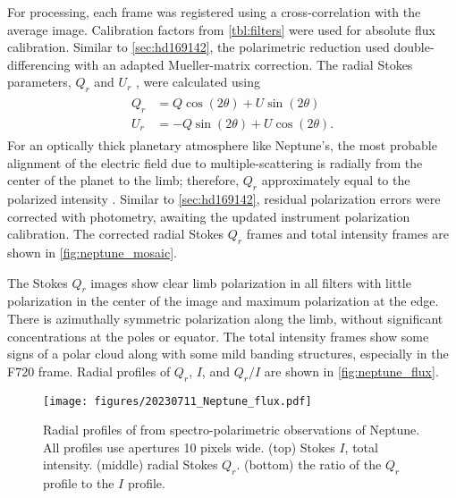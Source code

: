 For processing, each frame was registered using a cross-correlation with the average image. Calibration factors from \autoref{tbl:filters} were used for absolute flux calibration. Similar to \autoref{sec:hd169142}, the polarimetric reduction used double-differencing with an adapted Mueller-matrix correction. The radial Stokes parameters, $Q_r$ and $U_r$ \citep{schmid_limb_2006}, were calculated using
\begin{align}
    \label{eqn:rad_stokes}
\begin{split}
    Q_r &= Q\cos{\left(2\theta\right)} + U\sin{\left(2\theta\right)} \\
    U_r &= -Q\sin{\left(2\theta\right)} + U\cos{\left(2\theta\right)}.
\end{split}
\end{align}
For an optically thick planetary atmosphere like Neptune's, the most probable alignment of the electric field due to multiple-scattering is radially from the center of the planet to the limb; therefore, $Q_r$ approximately equal to the polarized intensity \citep{schmid_limb_2006}. Similar to \autoref{sec:hd169142}, residual polarization errors were corrected with photometry, awaiting the updated instrument polarization calibration. The corrected radial Stokes $Q_r$ frames and total intensity frames are shown in \autoref{fig:neptune_mosaic}.

The Stokes $Q_r$ images show clear limb polarization in all filters with little polarization in the center of the image and maximum polarization at the edge. There is azimuthally symmetric polarization along the limb, without significant concentrations at the poles or equator. The total intensity frames show some signs of a polar cloud along with some mild banding structures, especially in the F720 frame. Radial profiles of $Q_r$, $I$, and $Q_r/I$ are shown in \autoref{fig:neptune_flux}.

\begin{figure}
    \centering
    \texttt{[image: figures/20230711\_Neptune\_flux.pdf]}
    \caption{Radial profiles of from spectro-polarimetric observations of Neptune. All profiles use apertures 10 pixels wide. (top) Stokes $I$, total intensity. (middle) radial Stokes $Q_r$. (bottom) the ratio of the $Q_r$ profile to the $I$ profile.\label{fig:neptune_flux}}
\end{figure}
